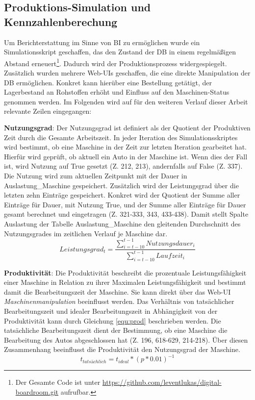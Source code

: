 \subsection{Produktions-Simulation und Kennzahlenberechung}
 Um Berichterstattung im Sinne von \ac{BI} zu ermöglichen wurde ein Simulationsskript geschaffen, das den Zustand der \ac{DB} in einem regelmäßigen Abstand erneuert\footnote{Der Gesamte Code ist unter \url{https://github.com/leventlukas/digital-boardroom.git} aufrufbar.}. Dadurch wird der Produktionsprozess widergespiegelt. Zusätzlich wurden mehrere Web-UIs geschaffen, die eine direkte Manipulation der \ac{DB} ermöglichen. Konkret kann hierüber eine Bestellung getätigt, der Lagerbestand an Rohstoffen erhöht und Einfluss auf den Maschinen-Status genommen werden. Im Folgenden wird auf für den weiteren Verlauf dieser Arbeit relevante Zeilen eingegangen:

\textbf{Nutzungsgrad}: Der Nutzungsgrad ist definiert als der Quotient der Produktiven Zeit durch die Gesamte Arbeitszeit. In jeder Iteration des Simulationsskriptes wird bestimmt, ob eine Maschine in der Zeit zur letzten Iteration gearbeitet hat. Hierfür wird geprüft, ob aktuell ein Auto in der Maschine ist. Wenn dies der Fall ist, wird Nutzung auf True gesetzt (Z. 212, 213), andernfalls
 auf False (Z. 337). Die Nutzung wird zum aktuellen Zeitpunkt mit der Dauer in Auslastung\_Maschine gespeichert. Zusätzlich wird der Leistungsgrad über die letzten zehn Einträge gespeichert. Konkret wird der Quotient der Summe aller Einträge für Dauer, mit Nutzung True, und der Summe aller Einträge für Dauer gesamt berechnet und eingetragen (Z. 321-333, 343, 433-438). Damit stellt Spalte Auslastung der Tabelle Auslastung\_Maschine den gleitenden Durchschnitt des Nutzungsgrades im zeitlichen Verlauf je Maschine dar.
 \begin{equation}\label{equ:nutz}
    Leistungsgrad_t = \frac{\sum_{i=t-10}^{t-1} Nutzungsdauer_i}{\sum_{i=t-10}^{t-1} Laufzeit_i}
\end{equation}

\textbf{Produktivität}: Die Produktivität beschreibt die prozentuale Leistungsfähigkeit einer Maschine in Relation zu ihrer Maximalen Leistungsfähigkeit und bestimmt damit die Bearbeitungszeit der Maschine. Sie kann direkt über das Web-UI \textit{Maschinenmanipulation} beeinflusst werden. Das Verhältnis von tatsächlicher Bearbeitungszeit und idealer Bearbeitungszeit in Abhängigkeit von der Produktivität kann durch Gleichung \ref{equ:prod} beschrieben werden. Die tatsächliche Bearbeitungszeit dient der Bestimmung, ob eine Maschine die Bearbeitung des Autos abgeschlossen hat (Z. 196, 618-629, 214-218). Über diesen Zusammenhang beeinflusst die Produktivität den Nutzungsgrad der Maschine.
\begin{equation}\label{equ:prod}
    t_{tatsächlich} = t_{ideal}*(p*0.01)^{-1}
\end{equation}


